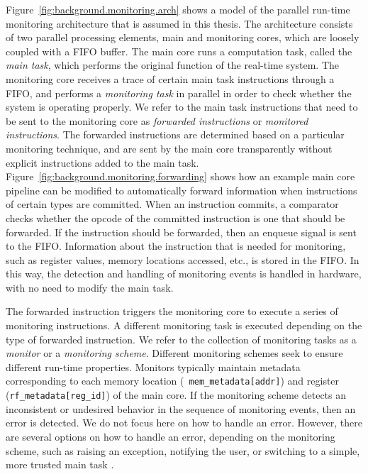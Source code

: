 Figure~\ref{fig:background.monitoring.arch} shows a model of the
parallel run-time monitoring architecture that is assumed in this thesis. The
architecture consists of two parallel processing elements, main and monitoring
cores, which are loosely coupled with a FIFO buffer.  The main core runs a
computation task, called the {\em main task}, which performs the original
function of the real-time system.  The monitoring core receives a trace of
certain main task instructions through a FIFO, and performs a {\em monitoring
task} in parallel in order to check whether the system is operating properly.
We refer to the main task instructions that need to be sent to the monitoring
core as {\em forwarded instructions} or {\em monitored instructions}. The
forwarded instructions are determined based on a particular monitoring
technique, and are sent by the main core transparently without explicit
instructions added to the main task.
Figure~\ref{fig:background.monitoring.forwarding} shows how an example
main core pipeline can be modified to automatically forward information when
instructions of certain types are committed. When an instruction commits, a
comparator checks whether the opcode of the committed instruction is one that
should be forwarded. If the instruction should be forwarded, then an enqueue
signal is sent to the FIFO.  Information about the instruction that is needed
for monitoring, such as register values, memory locations accessed, etc., is
stored in the FIFO. In this way, the detection and handling of monitoring
events is handled in hardware, with no need to modify the main task.

The forwarded instruction triggers the monitoring core to execute a series of
monitoring instructions.  A different monitoring task is executed depending on
the type of forwarded instruction. We refer to the collection of monitoring
tasks as a \emph{monitor} or a \emph{monitoring scheme}. Different monitoring
schemes seek to ensure different run-time properties.  Monitors typically
maintain metadata corresponding to each memory location ({\tt
mem\_metadata[addr]}) and register ({\tt rf\_metadata[reg\_id]}) of the main
core.  If the monitoring scheme detects an inconsistent or undesired behavior
in the sequence of monitoring events, then an error is detected. We do not
focus here on how to handle an error. However, there are several options
on how to handle an error, depending on the monitoring scheme, such as raising
an exception, notifying the user, or switching to a simple, more trusted main
task \cite{sha-simplex-sw01}.

